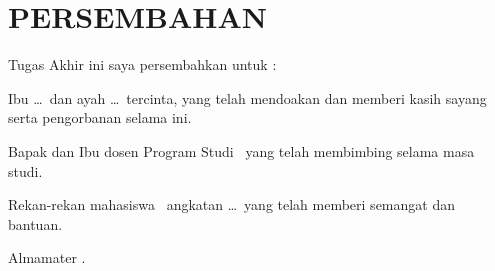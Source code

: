 \chapter*{PERSEMBAHAN}

\vspace{0.5\baselineskip}

\noindent Tugas Akhir ini saya persembahkan untuk :

\begin{packed_enum}
  \item Ibu \ldots\ dan ayah \ldots\ tercinta, yang telah mendoakan
        dan memberi kasih sayang serta pengorbanan selama ini.
  \item Bapak dan Ibu dosen Program Studi \prodi\ yang telah
        membimbing selama masa studi.
  \item Rekan-rekan mahasiswa \prodi\ angkatan \ldots\ yang telah
        memberi semangat dan bantuan.
  \item Almamater \institusi.
\end{packed_enum}
